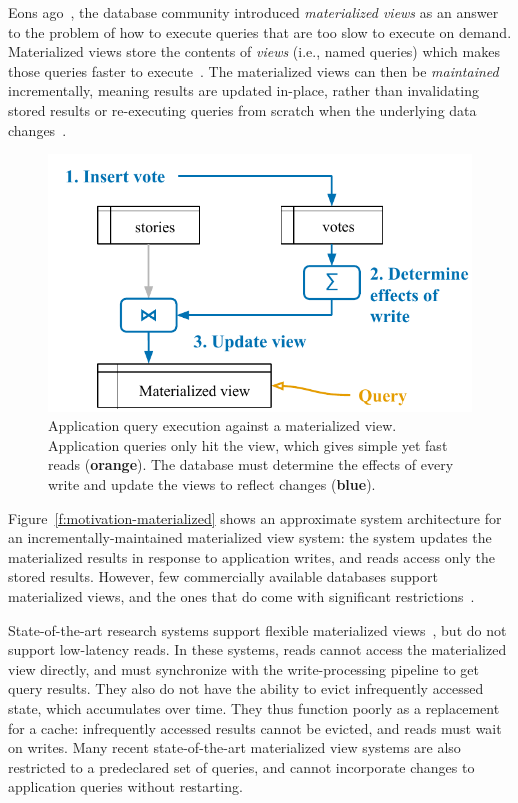 
Eons ago~\cite{relational-materialized-views,stonebraker-views}, the database
community introduced \textit{materialized views} as an answer to the problem of
how to execute queries that are too slow to execute on demand. Materialized
views store the contents of \textit{views} (i.e., named queries) which makes
those queries faster to execute~\cite{materialized-views}. The materialized
views can then be \textit{maintained} incrementally, meaning results are updated
in-place, rather than invalidating stored results or re-executing queries from
scratch when the underlying data changes~\cite{materialized-survey}.

\begin{figure}
  \centering
  \includegraphics{diagrams/Motivation Materialized Views.pdf}
  \caption{Application query execution against a materialized view. Application
  queries only hit the view, which gives simple yet fast reads
  (\textbf{\color{set2}orange}). The database must determine the effects of
  every write and update the views to reflect changes
  (\textbf{\color{set1}blue}).}
  \label{f:motivation-materialized}
\end{figure}

Figure~\vref{f:motivation-materialized} shows an approximate system architecture
for an incrementally-maintained materialized view system: the system updates the
materialized results in response to application writes, and reads access only
the stored results. However, few commercially available databases support
materialized views, and the ones that do come with significant
restrictions~\cite{mssql-materialized-view-restrictions}.

State-of-the-art research systems support flexible materialized
views~\cite{dbtoaster,materialize}, but do not support low-latency reads. In
these systems, reads cannot access the materialized view directly, and must
synchronize with the write-processing pipeline to get query results. They also
do not have the ability to evict infrequently accessed state, which accumulates
over time. They thus function poorly as a replacement for a cache: infrequently
accessed results cannot be evicted, and reads must wait on writes. Many recent
state-of-the-art materialized view systems are also restricted to a predeclared
set of queries, and cannot incorporate changes to application queries without
restarting.

